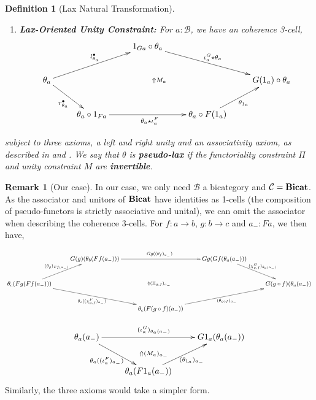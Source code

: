 \documentclass{article}
\numberwithin{equation}{section}
\theoremstyle{definition}
\newtheorem{remark}[equation]{Remark}
\theoremstyle{plain}
\newtheorem{definition}[equation]{Definition}
\newcommand{\Bicat}{\textnormal{\textbf{Bicat}}}
\begin{document}
\begin{definition}[Lax Natural Transformation]
\begin{enumerate}[label = $\bullet$]
\[{			(\theta_c \circ F(g)) \circ F(f) \ar@{}[urrr]|{\Uparrow\Pi_{g,f}} \ar[r]_{a_{\theta_c,F(g),F(f)}} \ar[u]^{\theta_g \star F(f)} & \theta_c \circ (F(g) \circ F(f)) \ar[r]_{\theta_c \star \chi^F_{g,f}} & \theta_c \circ F(g \circ f) \ar[r]_{\theta_{g\circ f}} & G(g\circ f)\theta_a
		}\]
		that forms a modification (2-cell) in $[\mathcal{B}(b,c)\times \mathcal{B}(a,c), \mathcal{C}(F(a),G(c))]_{l,l}$
		\item \textbf{Lax-Oriented Unity Constraint:} For $a: \mathcal{B}$, we have an coherence 3-cell,
		\[\xymatrix{
			&& 1_{Ga} \circ \theta_a \ar[drr]^{\iota^G_a\star \theta_a}\\
			\theta_a \ar[dr]_{r^{\bullet}_{\theta_a}} \ar[urr]^{l^{\bullet}_{\theta_a}} \ar@{}[rrrr]|{\Uparrow M_a} &&&& G(1_a) \circ \theta_a\\
			& \theta_a \circ 1_{Fa} \ar[rr]_{\theta_a\star \iota^F_a} && \theta_a \circ F(1_a) \ar[ur]_{\theta_{1_a}}\\
		}\]
	\end{enumerate}
	subject to three axioms, a left and right unity and an associativity axiom, as described in \cite{gordon1995coherence} and \cite{gurski_2013}. We say that $\theta$ is \textbf{pseudo-lax} if the functoriality constraint $\Pi$ and unity constraint $M$ are \textbf{invertible}. 
\end{definition}

\begin{remark}[Our case] In our case, we only need $\mathcal{B}$ a bicategory and $\mathcal{C} = \Bicat$. As the associator and unitors of $\Bicat$ have identities as 1-cells (the composition of pseudo-functors is strictly associative and unital), we can omit the associator when describing the coherence 3-cells. For $f: a \to b$, $g:b \to c$ and $a_-:Fa$, we then have,
	
	\[\resizebox{6in}{!}{\xymatrix{
			& G(g)(\theta_b(Ff(a_-))) \ar[rr]^{Gg((\theta_f)_{a_-})} && Gg(Gf(\theta_a(a_-))) \ar[dr]^{(\chi^G_{g,f})_{\theta_a(a_-)}}\\ \theta_c(Fg(Ff(a_-))) \ar[ur]^{(\theta_g)_{Ff(a_-)}} \ar[drr]_{\theta_c((\chi^F_{g,f})_{a_-})} \ar@{}[rrrr]|{\Uparrow (\Pi_{g,f})_{a_-}} &&&& G(g\circ f)(\theta_a(a_-))\\ && \theta_c(F(g\circ f)(a_-)) \ar[urr]_{(\theta_{g\circ f})_{a_-}}\\
	}}\]
	
	\[\xymatrix{
		\theta_a(a_-) \ar@{}[drr]|{\Uparrow (M_a)_{a_-}} \ar[rr]^{(\iota^G_a)_{\theta_a(a_-)}} \ar[dr]_{\theta_a((\iota^F_a)_{a_-})} &&  G1_a(\theta_a(a_-))\\
		& \theta_a(F1_a(a_-)) \ar[ur]_{(\theta_{1_a})_{a_-}} &
	}\]
	Similarly, the three axioms would take a simpler form.
\end{remark}
\end{document}
